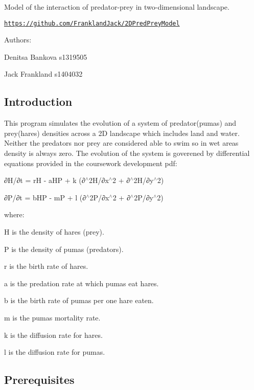 \href{https://travis-ci.org/FranklandJack/2DPredPreyModel}{\tt }

Model of the interaction of predator-\/prey in two-\/dimensional landscape.

\href{https://github.com/FranklandJack/2DPredPreyModel}{\tt https\+://github.\+com/\+Frankland\+Jack/2\+D\+Pred\+Prey\+Model}

Authors\+:
\begin{DoxyItemize}
\item Denitsa Bankova s1319505
\item Jack Frankland s1404032
\end{DoxyItemize}

\subsection*{Introduction}

This program simulates the evolution of a system of predator(pumas) and prey(hares) densities across a 2D landscape which includes land and water. Neither the predators nor prey are considered able to swim so in wet areas density is always zero. The evolution of the system is goverened by differential equations provided in the coursework development pdf\+:

∂\+H/∂t = rH -\/ a\+HP + k (∂$^\wedge$2\+H/∂x$^\wedge$2 + ∂$^\wedge$2\+H/∂y$^\wedge$2)

∂\+P/∂t = b\+HP -\/ mP + l (∂$^\wedge$2\+P/∂x$^\wedge$2 + ∂$^\wedge$2\+P/∂y$^\wedge$2)

where\+:


\begin{DoxyItemize}
\item H is the density of hares (prey).
\item P is the density of pumas (predators).
\item r is the birth rate of hares.
\item a is the predation rate at which pumas eat hares.
\item b is the birth rate of pumas per one hare eaten.
\item m is the pumas mortality rate.
\item k is the diffusion rate for hares.
\item l is the diffusion rate for pumas.
\end{DoxyItemize}

\subsection*{Prerequisites}

